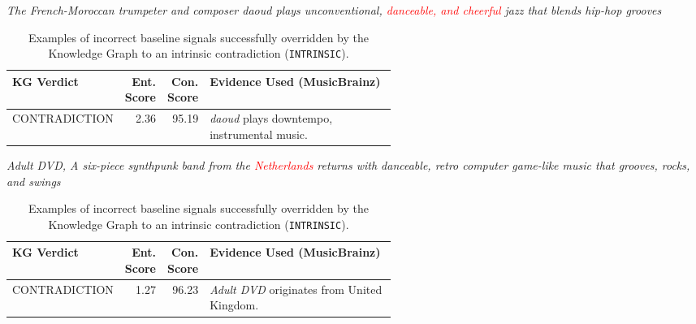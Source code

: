 \begin{table}[htbp]
    \centering
    \caption{Examples of incorrect baseline signals successfully overridden by the Knowledge Graph to an intrinsic contradiction (\texttt{INTRINSIC}).}    \label{tab:hybrid_validation_examples}
    \renewcommand{\arraystretch}{1.3}

    \vspace{0.2cm}
    \begin{flushleft}
         \textit{The French-Moroccan trumpeter and composer daoud plays unconventional, \textcolor{red}{danceable, and cheerful} jazz that blends hip-hop grooves}
    \end{flushleft}
    \vspace{-0.3cm} 
    \begin{tabular}{l r r p{0.55\linewidth}}
        \toprule
        \textbf{KG Verdict} & \textbf{Ent. Score} & \textbf{Con. Score} & \textbf{Evidence Used (MusicBrainz)} \\
        \midrule
        CONTRADICTION & 2.36 & 95.19 & \textit{daoud} plays downtempo, instrumental music. \\
        \bottomrule
    \end{tabular}

    \vspace{0.4cm} %

    \begin{flushleft}
         \textit{Adult DVD, A six-piece synthpunk band from the \textcolor{red}{Netherlands} returns with danceable, retro computer game-like music that grooves, rocks, and swings}
    \end{flushleft}
    \vspace{-0.3cm}
    \begin{tabular}{l r r p{0.55\linewidth}}
        \toprule
        \textbf{KG Verdict} & \textbf{Ent. Score} & \textbf{Con. Score} & \textbf{Evidence Used (MusicBrainz)} \\
        \midrule
        CONTRADICTION & 1.27 & 96.23 & \textit{Adult DVD} originates from United Kingdom. \\
        \bottomrule
    \end{tabular}
\end{table}

